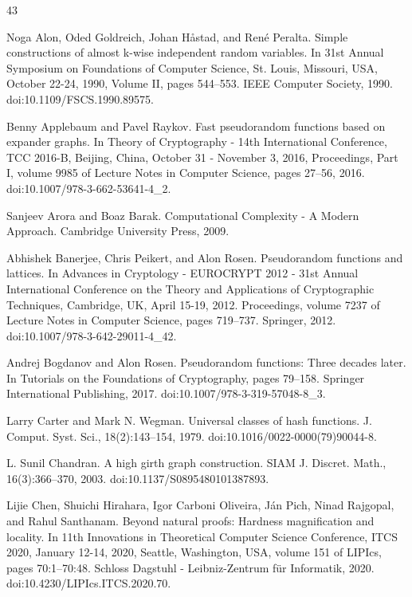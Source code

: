 \documentclass[10pt,a4paper]{article}
\begin{document}
\begin{thebibliography}{43}

Noga Alon, Oded Goldreich, Johan Håstad, and René Peralta. Simple constructions of almost k-wise independent random variables. In 31st Annual Symposium on Foundations of Computer Science, St. Louis, Missouri, USA, October 22-24, 1990, Volume II, pages 544–553. IEEE Computer Society, 1990. doi:10.1109/FSCS.1990.89575.

Benny Applebaum and Pavel Raykov. Fast pseudorandom functions based on expander graphs. In Theory of Cryptography - 14th International Conference, TCC 2016-B, Beijing, China, October 31 - November 3, 2016, Proceedings, Part I, volume 9985 of Lecture Notes in Computer Science, pages 27–56, 2016. doi:10.1007/978-3-662-53641-4\_2.

Sanjeev Arora and Boaz Barak. Computational Complexity - A Modern Approach. Cambridge University Press, 2009.

Abhishek Banerjee, Chris Peikert, and Alon Rosen. Pseudorandom functions and lattices. In Advances in Cryptology - EUROCRYPT 2012 - 31st Annual International Conference on the Theory and Applications of Cryptographic Techniques, Cambridge, UK, April 15-19, 2012. Proceedings, volume 7237 of Lecture Notes in Computer Science, pages 719–737. Springer, 2012. doi:10.1007/978-3-642-29011-4\_42.

Andrej Bogdanov and Alon Rosen. Pseudorandom functions: Three decades later. In Tutorials on the Foundations of Cryptography, pages 79–158. Springer International Publishing, 2017. doi:10.1007/978-3-319-57048-8\_3.

Larry Carter and Mark N. Wegman. Universal classes of hash functions. J. Comput. Syst. Sci., 18(2):143–154, 1979. doi:10.1016/0022-0000(79)90044-8.

L. Sunil Chandran. A high girth graph construction. SIAM J. Discret. Math., 16(3):366–370, 2003. doi:10.1137/S0895480101387893.

Lijie Chen, Shuichi Hirahara, Igor Carboni Oliveira, Ján Pich, Ninad Rajgopal, and Rahul Santhanam. Beyond natural proofs: Hardness magnification and locality. In 11th Innovations in Theoretical Computer Science Conference, ITCS 2020, January 12-14, 2020, Seattle, Washington, USA, volume 151 of LIPIcs, pages 70:1–70:48. Schloss Dagstuhl - Leibniz-Zentrum für Informatik, 2020. doi:10.4230/LIPIcs.ITCS.2020.70.


\end{thebibliography}
\end{document}
